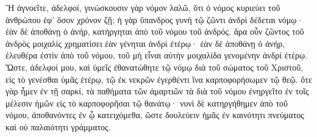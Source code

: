 \documentclass{openreader}
\begin{document}
Ἢ ἀγνοεῖτε, ἀδελφοί, γινώσκουσιν γὰρ νόμον λαλῶ, ὅτι ὁ νόμος κυριεύει τοῦ ἀνθρώπου ἐφ’ ὅσον χρόνον ζῇ; 
ἡ γὰρ ὕπανδρος γυνὴ τῷ ζῶντι ἀνδρὶ δέδεται νόμῳ· ἐὰν δὲ ἀποθάνῃ ὁ ἀνήρ, κατήργηται ἀπὸ τοῦ νόμου τοῦ ἀνδρός. 
ἄρα οὖν ζῶντος τοῦ ἀνδρὸς μοιχαλὶς χρηματίσει ἐὰν γένηται ἀνδρὶ ἑτέρῳ· ἐὰν δὲ ἀποθάνῃ ὁ ἀνήρ, ἐλευθέρα ἐστὶν ἀπὸ τοῦ νόμου, τοῦ μὴ εἶναι αὐτὴν μοιχαλίδα γενομένην ἀνδρὶ ἑτέρῳ. 
Ὥστε, ἀδελφοί μου, καὶ ὑμεῖς ἐθανατώθητε τῷ νόμῳ διὰ τοῦ σώματος τοῦ Χριστοῦ, εἰς τὸ γενέσθαι ὑμᾶς ἑτέρῳ, τῷ ἐκ νεκρῶν ἐγερθέντι ἵνα καρποφορήσωμεν τῷ θεῷ. 
ὅτε γὰρ ἦμεν ἐν τῇ σαρκί, τὰ παθήματα τῶν ἁμαρτιῶν τὰ διὰ τοῦ νόμου ἐνηργεῖτο ἐν τοῖς μέλεσιν ἡμῶν εἰς τὸ καρποφορῆσαι τῷ θανάτῳ· 
νυνὶ δὲ κατηργήθημεν ἀπὸ τοῦ νόμου, ἀποθανόντες ἐν ᾧ κατειχόμεθα, ὥστε δουλεύειν ἡμᾶς ἐν καινότητι πνεύματος καὶ οὐ παλαιότητι γράμματος. 
\end{document}
